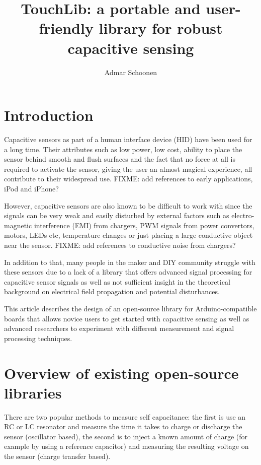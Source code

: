 \documentclass[format=sigchi, screen=true, review=true]{acmart}
\begin{document}


\title{TouchLib: a portable and user-friendly library for robust capacitive sensing}
\author{Admar Schoonen}
\maketitle
\section{Introduction}
Capacitive sensors as part of a human interface device (HID) have been used for
a long time. Their attributes such as low power, low cost, ability to place the
sensor behind smooth and flush surfaces and the fact that no force at all is
required to activate the sensor, giving the user an almost magical experience,
all contribute to their widespread use. FIXME: add references to early
applications, iPod and iPhone?

However, capacitive sensors are also known to be difficult to work with since
the signals can be very weak and easily disturbed by external factors such as
electro-magnetic interference (EMI) from chargers, PWM signals from power
convertors, motors, LEDs etc, temperature changes or just placing a large
conductive object near the sensor. FIXME: add references to conductive noise
from chargers?

In addition to that, many people in the maker and DIY community struggle with
these sensors due to a lack of a library that offers advanced signal processing
for capacitive sensor signals as well as not sufficient insight in the
theoretical background on electrical field propagation and potential
disturbances.

This article describes the design of an open-source library for
Arduino-compatible boards that allows novice users to get started with
capacitive sensing as well as advanced researchers to experiment with different
measurement and signal processing techniques.

\section{Overview of existing open-source libraries}
There are two popular methods to measure self capacitance: the first is use an
RC or LC resonator and measure the time it takes to charge or discharge the
sensor (oscillator based), the second is to inject a known amount of charge
(for example by using a reference capacitor) and measuring the resulting
voltage on the sensor (charge transfer based).
\end{document}
